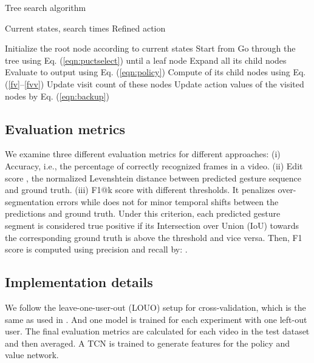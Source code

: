 \documentclass[letterpaper, 10 pt, conference]{ieeeconf}
\begin{document}
\begin{algorithm}[t]
	\caption{Tree search algorithm} \label{algorithm1} 
	\begin{algorithmic}[0]  
		\Require Current states, search times 
		\Ensure Refined action 
		
		\State Initialize the root node  according to current states	
		\For{} 
		\State Start from 
		\State Go through the tree using Eq. (\ref{eqn:puctselect}) until a leaf node  
		\State Expand all its child nodes 
		\State Evaluate  to output  using Eq. (\ref{eqn:policy}) 
		\State Compute  of its child nodes using Eq. (\ref{fv}--\ref{fvv})		
		\EndIf
		\State Update visit count of these nodes
		\State Update action values of the visited nodes by Eq. (\ref{eqn:backup}) 
		
		\EndFor 
		\State   
		\Else
		\State  
		\EndIf
		\State \Return{} 	
		
		
	\end{algorithmic}  
	\label{algorithm}
\end{algorithm}


\subsection{Evaluation metrics}
We examine three different evaluation metrics for different approaches: (i) Accuracy, i.e., the percentage of correctly recognized frames in a video. (ii) Edit score \cite{lea2016segmental}, the normalized Levenshtein distance between predicted gesture sequence and ground truth. (iii) F1@k score \cite{lea2017temporal} with different thresholds. It penalizes over-segmentation errors while does not for minor temporal shifts between the predictions and ground truth. Under this criterion, each predicted gesture segment is considered true positive if its Intersection over Union (IoU) towards the corresponding ground truth is above the threshold and vice versa. Then, F1 score is computed using precision and recall by: .


\subsection{Implementation details}

We follow the leave-one-user-out (LOUO) setup for cross-validation, which is the same as used in \cite{ahmidi2017dataset}. And one model is trained for each experiment with one left-out user. The final evaluation metrics are calculated for each video in the test dataset and then averaged. A TCN is trained to generate features for the policy and value network. 
\end{document}
